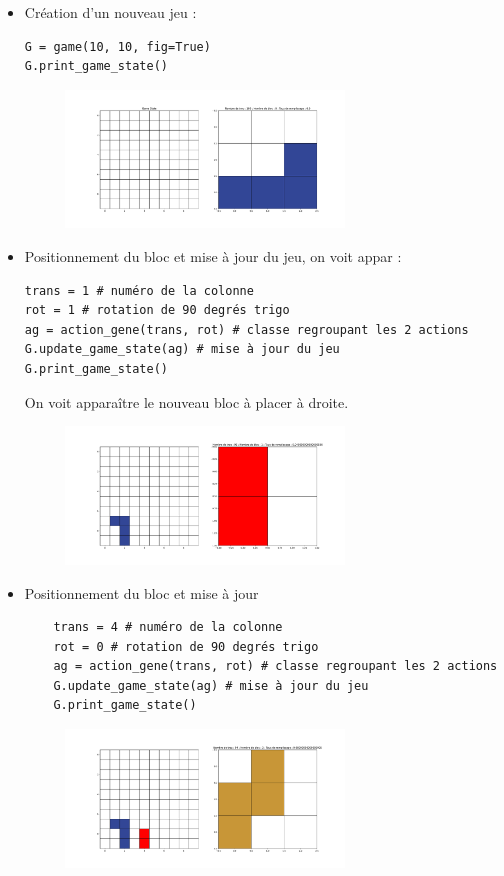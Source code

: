 \documentclass[10pt,a4paper]{article}
\begin{document}
\begin{itemize}
	\item Création d'un nouveau jeu : 
\begin{verbatim}
G = game(10, 10, fig=True)
G.print_game_state()
\end{verbatim}

\begin{figure}[ht!]
	\centering
	\includegraphics[width=0.7\textwidth]{new_game.pdf}
\end{figure}
\item Positionnement du bloc et mise à jour du jeu, on voit appar :
\begin{verbatim}
trans = 1 # numéro de la colonne
rot = 1 # rotation de 90 degrés trigo
ag = action_gene(trans, rot) # classe regroupant les 2 actions
G.update_game_state(ag) # mise à jour du jeu
G.print_game_state()
\end{verbatim}

On voit apparaître le nouveau bloc à placer à droite.
\begin{figure}[ht!]
	\centering
	\includegraphics[width=0.7\textwidth]{update_game.pdf}
\end{figure}

\item Positionnement du bloc et mise à jour
\begin{verbatim}
	trans = 4 # numéro de la colonne
	rot = 0 # rotation de 90 degrés trigo
	ag = action_gene(trans, rot) # classe regroupant les 2 actions
	G.update_game_state(ag) # mise à jour du jeu
	G.print_game_state()
\end{verbatim}
\begin{figure}[ht!]
	\centering
	\includegraphics[width=0.7\textwidth]{update_game_2.pdf}
\end{figure}

\end{itemize}
\end{document}
